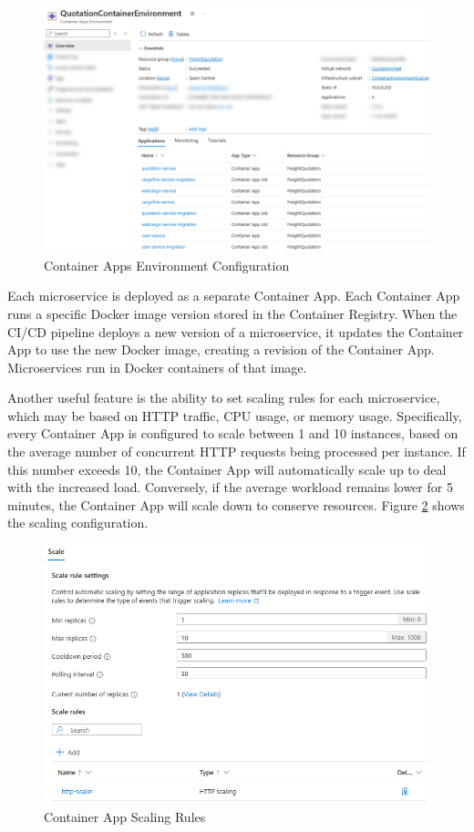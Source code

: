 \documentclass[12pt,reqno, oneside]{amsbook}
\theoremstyle{definition}
\theoremstyle{definition}
\numberwithin{section}{chapter}
\numberwithin{table}{chapter}
\numberwithin{figure}{chapter}
\begin{document}
\begin{figure}[H]
  \centering
  \includegraphics[width=1\linewidth]{images/ContainerAppsEnvironment.png}
  \caption{\label{Figure:ContainerAppsEnvironment}Container Apps Environment Configuration}
\end{figure}

Each microservice is deployed as a separate Container App. Each Container App runs a specific Docker image version stored in the Container Registry. When the \ac{CI/CD} pipeline deploys a new version of a microservice, it updates the Container App to use the new Docker image, creating a revision of the Container App. Microservices run in Docker containers of that image.

Another useful feature is the ability to set scaling rules for each microservice, which may be based on \ac{HTTP} traffic, \ac{CPU} usage, or memory usage. Specifically, every Container App is configured to scale between 1 and 10 instances, based on the average number of concurrent \ac{HTTP} requests being processed per instance. If this number exceeds 10, the Container App will automatically scale up to deal with the increased load. Conversely, if the average workload remains lower for 5 minutes, the Container App will scale down to conserve resources. Figure \ref{Figure:ContainerAppsScaling} shows the scaling configuration.

\begin{figure}[H]
  \centering
  \includegraphics[width=0.9\linewidth]{images/ContainerAppsScaling.png}
  \caption{\label{Figure:ContainerAppsScaling}Container App Scaling Rules}
\end{figure}
\end{document}
